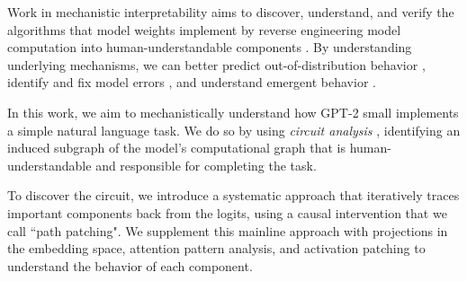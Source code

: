 Work in mechanistic interpretability aims to discover, understand, and verify the algorithms that model weights implement by reverse engineering model computation into human-understandable components \citep{AnthropicMechanisticEssay, meng2022locating, geiger2021causal, geva2020transformer}. By understanding underlying mechanisms, we can better predict out-of-distribution behavior \citep{mu2020compositionalExplanations}, identify and fix model errors \citep{hernandez2021natural,vig2020investigating}, and understand emergent behavior \citep{meca_interp_grokking,barak2022hidden,Wei2022EmergentAO}.

In this work, we aim to mechanistically understand how GPT-2 small \citep{GPT2} implements a simple natural language task. We do so by using \emph{circuit analysis} \citep{interp_survey}, identifying an induced subgraph of the model's computational graph that is human-understandable and responsible for completing the task.




To discover the circuit, we introduce a systematic approach that iteratively traces important components back from the logits, using a causal intervention that we call ``path patching". We supplement this mainline approach with projections in the embedding space, attention pattern analysis, and activation patching to understand the behavior of each component.



